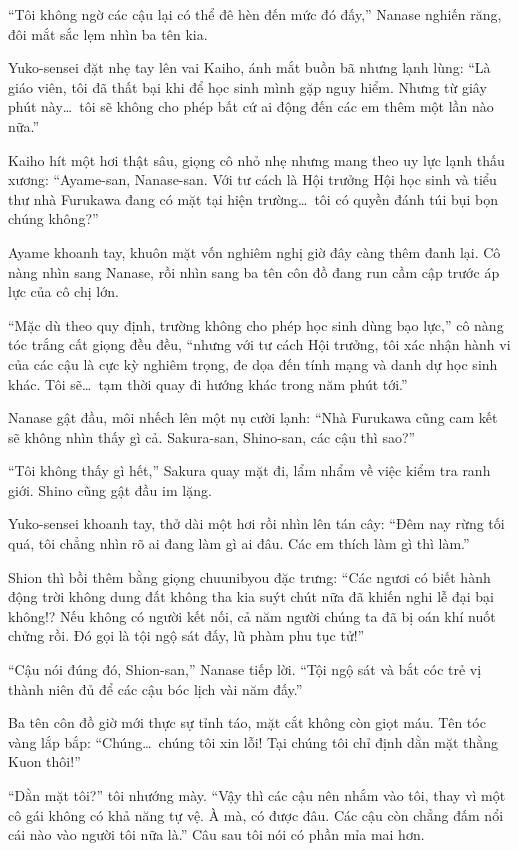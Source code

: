\documentclass[../main.tex]{subfiles}
\begin{document}
``Tôi không ngờ các cậu lại có thể đê hèn đến mức đó đấy,'' Nanase nghiến răng, đôi mắt sắc lẹm nhìn ba tên kia.

Yuko-sensei đặt nhẹ tay lên vai Kaiho, ánh mắt buồn bã nhưng lạnh lùng: ``Là giáo viên, tôi đã thất bại khi để học sinh mình gặp nguy hiểm. Nhưng từ giây phút này\dots\ tôi sẽ không cho phép bất cứ ai động đến các em thêm một lần nào nữa.''

Kaiho hít một hơi thật sâu, giọng cô nhỏ nhẹ nhưng mang theo uy lực lạnh thấu xương: ``Ayame-san, Nanase-san. Với tư cách là Hội trưởng Hội học sinh và tiểu thư nhà Furukawa đang có mặt tại hiện trường\dots\ tôi có quyền đánh túi bụi bọn chúng không?''

Ayame khoanh tay, khuôn mặt vốn nghiêm nghị giờ đây càng thêm đanh lại. Cô nàng nhìn sang Nanase, rồi nhìn sang ba tên côn đồ đang run cầm cập trước áp lực của cô chị lớn.

``Mặc dù theo quy định, trường không cho phép học sinh dùng bạo lực,'' cô nàng tóc trắng cất giọng đều đều, ``nhưng với tư cách Hội trưởng, tôi xác nhận hành vi của các cậu là cực kỳ nghiêm trọng, đe dọa đến tính mạng và danh dự học sinh khác. Tôi sẽ\dots\ tạm thời quay đi hướng khác trong năm phút tới.''

Nanase gật đầu, môi nhếch lên một nụ cười lạnh: ``Nhà Furukawa cũng cam kết sẽ không nhìn thấy gì cả. Sakura-san, Shino-san, các cậu thì sao?''

``Tôi không thấy gì hết,'' Sakura quay mặt đi, lẩm nhẩm về việc kiểm tra ranh giới. Shino cũng gật đầu im lặng.

Yuko-sensei khoanh tay, thở dài một hơi rồi nhìn lên tán cây: ``Đêm nay rừng tối quá, tôi chẳng nhìn rõ ai đang làm gì ai đâu. Các em thích làm gì thì làm.''

Shion thì bồi thêm bằng giọng chuunibyou đặc trưng: ``Các ngươi có biết hành động trời không dung đất không tha kia suýt chút nữa đã khiến nghi lễ đại bại không!? Nếu không có người kết nối, cả năm người chúng ta đã bị oán khí nuốt chửng rồi. Đó gọi là tội ngộ sát đấy, lũ phàm phu tục tử!''

``Cậu nói đúng đó, Shion-san,'' Nanase tiếp lời. ``Tội ngộ sát và bắt cóc trẻ vị thành niên đủ để các cậu bóc lịch vài năm đấy.''

Ba tên côn đồ giờ mới thực sự tỉnh táo, mặt cắt không còn giọt máu. Tên tóc vàng lắp bắp: ``Chúng\dots\ chúng tôi xin lỗi! Tại chúng tôi chỉ định dằn mặt thằng Kuon thôi!''

``Dằn mặt tôi?'' tôi nhướng mày. ``Vậy thì các cậu nên nhắm vào tôi, thay vì một cô gái không có khả năng tự vệ. À mà, có được đâu. Các cậu còn chẳng đấm nổi cái nào vào người tôi nữa là.'' Câu sau tôi nói có phần mỉa mai hơn.
\end{document}
